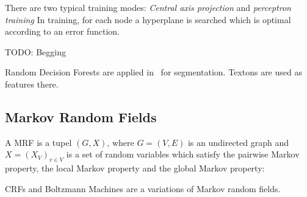 There are two typical training modes: \textit{Central axis projection} and
\textit{perceptron training} In training, for each node a hyperplane is
searched which is optimal according to an error function.

TODO: Begging

Random Decision Forests are applied in~\cite{shotton2008semantic} for
segmentation. Textons are used as features there.


\subsection{Markov Random Fields}\label{subsec:markov-random-fields}
A \Gls{MRF} is a tupel $(G, X)$, where $G=(V,E)$ is an undirected graph and
$X=(X_V)_{v \in V}$ is a set of random variables which satisfy the pairwise
Markov property, the local Markov property and the global Markov property:



\Glspl{CRF} and Boltzmann Machines are a variations of Markov random fields.

%




